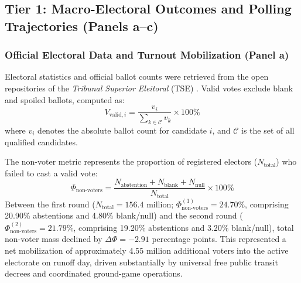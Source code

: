 \subsection*{Tier 1: Macro-Electoral Outcomes and Polling Trajectories (Panels a--c)}

\subsubsection*{Official Electoral Data and Turnout Mobilization (Panel a)}
Electoral statistics and official ballot counts were retrieved from the open repositories of the \emph{Tribunal Superior Eleitoral} (TSE) \citep{tse2026resultados}. Valid votes exclude blank and spoiled ballots, computed as:
\begin{equation}
V_{\text{valid}, i} = \frac{v_i}{\sum_{k \in \mathcal{C}} v_k} \times 100\%
\end{equation}
where $v_i$ denotes the absolute ballot count for candidate $i$, and $\mathcal{C}$ is the set of all qualified candidates. 

The non-voter metric represents the proportion of registered electors ($N_{\text{total}}$) who failed to cast a valid vote:
\begin{equation}
\Phi_{\text{non-voters}} = \frac{N_{\text{abstention}} + N_{\text{blank}} + N_{\text{null}}}{N_{\text{total}}} \times 100\%
\end{equation}
Between the first round ($N_{\text{total}} = 156.4$ million; $\Phi_{\text{non-voters}}^{(1)} = 24.70\%$, comprising 20.90\% abstentions and 4.80\% blank/null) and the second round ($\Phi_{\text{non-voters}}^{(2)} = 21.79\%$, comprising 19.20\% abstentions and 3.20\% blank/null), total non-voter mass declined by $\Delta \Phi = -2.91$ percentage points. This represented a net mobilization of approximately 4.55 million additional voters into the active electorate on runoff day, driven substantially by universal free public transit decrees and coordinated ground-game operations.

